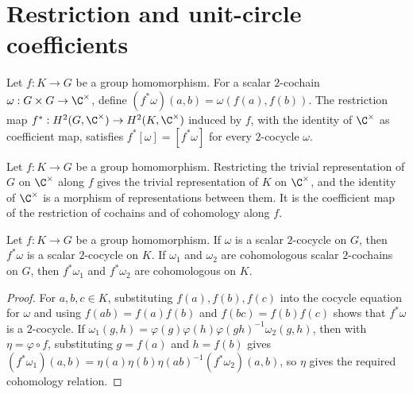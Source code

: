 \section{Restriction and unit-circle coefficients}
\label{sec:projective_restriction}

\begin{definition}
    \label{def:mpug_h2_pullback}
    \leanok
    Let $f:K\to G$ be a group homomorphism. For a scalar $2$-cochain
    $\omega:G\times G\to\C^\times$, define
    $(f^*\omega)(a,b)=\omega(f(a),f(b))$.
    The restriction map
    $f^*:H^2(G,\C^\times)\to H^2(K,\C^\times)$ induced by $f$, with the
    identity of $\C^\times$ as coefficient map, satisfies
    $f^*[\omega]=[f^*\omega]$ for every $2$-cocycle $\omega$.
\end{definition}

\begin{definition}
    \label{def:scalar_representation_res}
    \leanok
    Let $f:K\to G$ be a group homomorphism. Restricting the trivial
    representation of $G$ on $\C^\times$ along $f$ gives the trivial
    representation of $K$ on $\C^\times$, and the identity of $\C^\times$ is a
    morphism of representations between them. It is the coefficient map of
    the restriction of cochains and of cohomology along $f$.
\end{definition}

\begin{lemma}
    \label{thm:mpug_h2_pullback_preserves}
    \leanok
    Let $f:K\to G$ be a group homomorphism. If $\omega$ is a scalar
    $2$-cocycle on $G$, then $f^*\omega$ is a scalar $2$-cocycle on $K$.
    If $\omega_1$ and $\omega_2$ are cohomologous scalar $2$-cochains on $G$,
    then $f^*\omega_1$ and $f^*\omega_2$ are cohomologous on $K$.
\end{lemma}

\begin{proof}\leanok
    For $a,b,c\in K$, substituting $f(a),f(b),f(c)$ into the cocycle equation
    for $\omega$ and using $f(ab)=f(a)f(b)$ and $f(bc)=f(b)f(c)$ shows that
    $f^*\omega$ is a $2$-cocycle.
    If $\omega_1(g,h)=\varphi(g)\varphi(h)\varphi(gh)^{-1}\omega_2(g,h)$,
    then with $\eta=\varphi\circ f$, substituting $g=f(a)$ and $h=f(b)$ gives
    $(f^*\omega_1)(a,b)=\eta(a)\eta(b)\eta(ab)^{-1}(f^*\omega_2)(a,b)$,
    so $\eta$ gives the required cohomology relation.
\end{proof}

